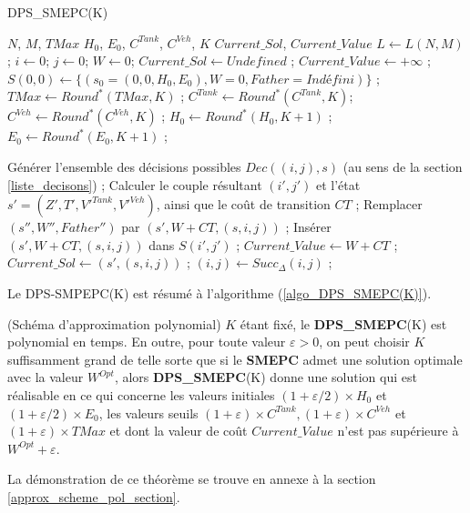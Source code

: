 \begin{algorithm} 
	\caption{DPS\_SMEPC(K)}
	\label{algo_DPS_SMEPC(K)}
	\begin{algorithmic}[1]
		\REQUIRE $N$, $M$, $TMax$ $H_0$, $E_0$, $C^{Tank}$, $C^{Veh}$, $K$
		\ENSURE $Current\_Sol$, $Current\_Value$
		\hline
		\vspace{0.5cm}
		\INITIALISATION
		\STATE $L \leftarrow L(N,M) $ ; $i \leftarrow 0$; $j \leftarrow 0$; $W \leftarrow 0$; $Current\_Sol \leftarrow Undefined$ ;
		\STATE $Current\_Value \leftarrow +\infty$ ; $S(0,0) \leftarrow \{(s_0=(0,0,H_0,E_0), W=0, Father=Indéfini)\}$ ; 
		\STATE $TMax \leftarrow Round^*(TMax, K)$ ; $C^{Tank} \leftarrow Round^*(C^{Tank}, K)$; 
		\STATE $C^{Veh} \leftarrow Round^*(C^{Veh}, K)$ ; $H_0 \leftarrow Round^*(H_0, K+1)$ ; $E_0 \leftarrow Round^*(E_0, K+1)$ ;
		
		\vspace{0.3cm}
		
		\BOUCLEPRINCIPAL
		\vspace{0.2cm}
		\STATE Générer l'ensemble des décisions possibles $Dec((i,j),s)$ (au sens de la section \ref{liste_decisons}) ;
		\STATE Calculer le couple résultant $(i',j')$ et l'état $s'=(Z', T', V'^{Tank}, V'^{Veh})$, ainsi que le coût de transition $CT$ ; 
		\STATE Remplacer $(s'', W'', Father'')$ par $(s', W+CT, (s,i,j))$ ;
		\ELSE
		\STATE Insérer $(s', W+CT, (s,i,j))$ dans $S(i',j')$ ;
		\ENDIF
		\STATE $Current\_Value \leftarrow W+CT$ ;
		\STATE $Current\_Sol \leftarrow (s', (s,i,j))$ ;
		\ENDIF
		\ENDFOR
		\ENDFOR
		\STATE $(i, j) \leftarrow Succ_{\Delta}(i,j)$ ;
		\ENDWHILE
	\end{algorithmic}
\end{algorithm}
Le DPS-SMPEPC(K) est résumé à l'algorithme (\ref{algo_DPS_SMEPC(K)}).
\begin{theo} (Schéma d'approximation polynomial)
	\label{approx_scheme_pol}
	$K$ étant fixé, le \textbf{DPS\_SMEPC}(K) est polynomial en temps. En outre, pour toute valeur $\varepsilon > 0$, on peut choisir $K$ suffisamment grand de telle sorte que si le \textbf{SMEPC} admet une solution optimale avec la valeur $W^{Opt}$, alors \textbf{DPS\_SMEPC}(K) donne une solution qui est réalisable en ce qui concerne les valeurs initiales $(1 + \varepsilon/ 2)\times H_0$ et $(1 + \varepsilon/ 2)\times E_0$, les valeurs seuils $(1 +\varepsilon )\times C^{Tank}, (1 + \varepsilon)\times C^{Veh}$ et $(1 + \varepsilon)\times TMax$ et dont la valeur de coût $Current\_Value$ n'est pas supérieure à $W^{Opt}+ \varepsilon$.
	\label{FPTAS_theo1} 
\end{theo}
La démonstration de ce théorème se trouve en annexe à la section \ref{approx_scheme_pol_section}.

